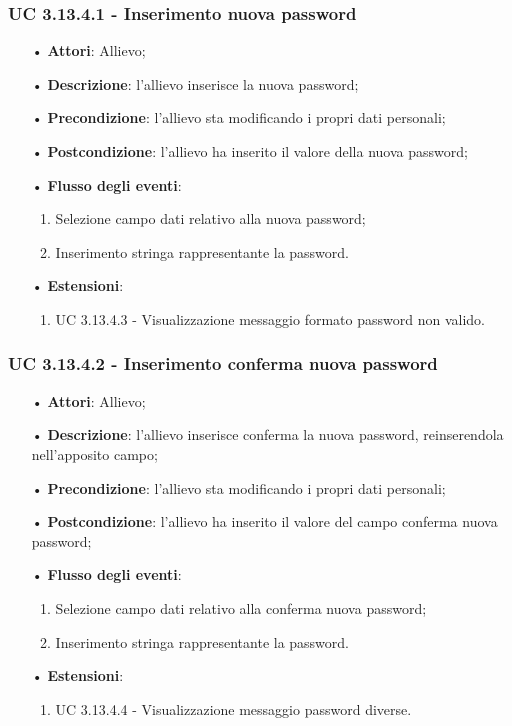 \subsubsection{UC 3.13.4.1 - Inserimento nuova password}
\begin{itemize}
	\item[•]\textbf{Attori}: Allievo;
	\item[•]\textbf{Descrizione}: l'allievo inserisce la nuova password;
	\item[•]\textbf{Precondizione}: l'allievo sta modificando i propri dati personali;
	\item[•]\textbf{Postcondizione}: l'allievo ha inserito il valore della nuova password; 
	\item[•]\textbf{Flusso degli eventi}: 
	\begin{enumerate}
		\item Selezione campo dati relativo alla nuova password;
		\item Inserimento stringa rappresentante la password.
	\end{enumerate}
	\item[•]\textbf{Estensioni}:
	\begin{enumerate}
		\item UC 3.13.4.3 - Visualizzazione messaggio formato password non valido.
	\end{enumerate}
\end{itemize}

\subsubsection{UC 3.13.4.2 - Inserimento conferma nuova password}
\begin{itemize}
	\item[•]\textbf{Attori}: Allievo;
	\item[•]\textbf{Descrizione}: l'allievo inserisce conferma la nuova password, reinserendola nell'apposito campo;
	\item[•]\textbf{Precondizione}: l'allievo sta modificando i propri dati personali;
	\item[•]\textbf{Postcondizione}: l'allievo ha inserito il valore del campo conferma nuova password; 
	\item[•]\textbf{Flusso degli eventi}: 
	\begin{enumerate}
		\item Selezione campo dati relativo alla conferma nuova password;
		\item Inserimento stringa rappresentante la password.
	\end{enumerate}
	\item[•]\textbf{Estensioni}:
	\begin{enumerate}
		\item UC 3.13.4.4 - Visualizzazione messaggio password diverse.
	\end{enumerate}
\end{itemize}

